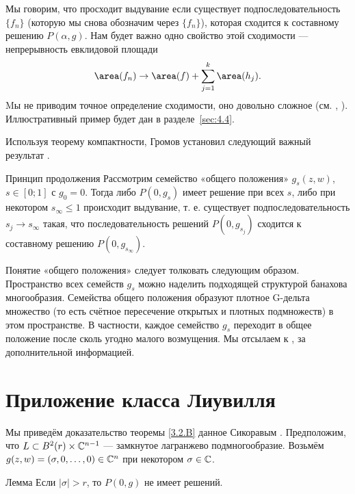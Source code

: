 Мы говорим, что просходит выдувание если существует подпоследовательность $\{f_n\}$ (которую мы снова обозначим через $\{f_n\}$), которая сходится к составному решению $P(\alpha,g)$.
Нам будет важно одно свойство этой сходимости — непрерывность
евклидовой площади
\[\area (f_n)
\to
\area(f)
+\sum_{j=1}^k\area (h_j).\]
Mы не приводим точное определение сходимости, оно довольно сложное (см. \cite{G1}, \cite{AL}).
Иллюстративный пример будет дан в разделе~\ref{sec:4.4}.

Используя теорему компактности, Громов установил следующий важный результат \cite{G1}.

\begin{thm*}{Принцип продолжения}
Рассмотрим семейство «общего положения» $g_s (z, w)$, $s \in [0;1]$ с
$g_0 = 0$. 
Тогда либо $P (0, g_s)$ имеет решение при всех $s$, либо при некотором $s_\infty \le 1$ происходит выдувание, т. е. существует
подпоследовательность  $s_j \to s_\infty$ такая, что
последовательность решений $P(0,g_{s_j})$ сходится к составному решению $P
(0, g_{s_\infty})$. 
\end{thm*}

Понятие «общего положения» следует толковать следующим образом.
Пространство всех семейств $g_s$ можно наделить подходящей структурой
банахова многообразия. 
Семейства общего положения образуют плотное G-дельта множество (то есть счётное пересечение открытых и плотных подмножеств) в этом пространстве.
В частности, каждое семейство $g_s$ переходит в общее положение после
сколь угодно малого возмущения. 
Мы отсылаем к \cite{G1}, \cite{AL} за дополнительной информацией.



\section{Приложение класса Лиувилля}

Мы приведём доказательство теоремы \ref{3.2.B} данное Сикоравым \cite{S1}.
Предположим, что $L \subset B^2 (r) \times \mathbb{C}^{n-1}$ — замкнутое
лагранжево подмногообразие. 
Возьмём $g (z, w) = (\sigma, 0 ,\dots, 0) \in \mathbb{C}^n$ при некотором $\sigma \in \mathbb{C}$.

\begin{thm}{Лемма}\label{4.3.A}
Если $| \sigma | > r$, то $P (0, g)$ не имеет решений.
\end{thm}


